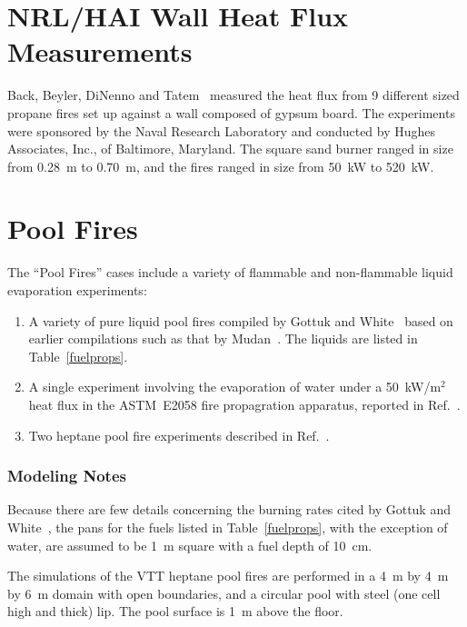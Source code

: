 \section{NRL/HAI Wall Heat Flux Measurements}
\label{NRL_HAI_Description}

Back, Beyler, DiNenno and Tatem~\cite{Back:IAFSS4} measured the heat flux from 9 different sized propane fires set up against a wall composed
of gypsum board. The experiments were sponsored by the Naval Research Laboratory and conducted by Hughes Associates, Inc., of Baltimore, Maryland. The
square sand burner ranged in size from 0.28~m to 0.70~m, and the fires ranged in size from 50~kW to 520~kW.


\section{Pool Fires}
\label{Pool_Fires_Description}

The ``Pool Fires'' cases include a variety of flammable and non-flammable liquid evaporation experiments:
\begin{enumerate}
\item A variety of pure liquid pool fires compiled by Gottuk and White~\cite{SFPE:Gottuk_and_White} based on earlier compilations such as that by Mudan~\cite{Mudan:1984}. The liquids are listed in Table~\ref{fuelprops}.
\item A single experiment involving the evaporation of water under a 50~kW/m$^2$ heat flux in the ASTM~E2058 fire propagration apparatus, reported in Ref.~\cite{SFPE:Tewarson}. 
\item Two heptane pool fire experiments described in Ref.~\cite{Sikanen:2016}.
\end{enumerate}

\subsubsection{Modeling Notes}

Because there are few details concerning the burning rates cited by Gottuk and White~\cite{SFPE:Gottuk_and_White}, the pans for the fuels listed in Table~\ref{fuelprops}, with the exception of water, are assumed to be 1~m square with a fuel depth of 10~cm.

The simulations of the VTT heptane pool fires are performed in a 4~m by 4~m by 6~m domain with open boundaries, and a circular pool with steel (one cell high and thick) lip. The pool surface is 1~m above the floor.

